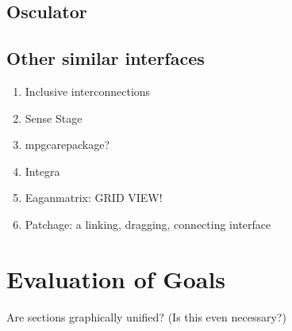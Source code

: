 	\subsection{Osculator} %
	\label{sub:osculator}
		\cite{osculator}

	\subsection{Other similar interfaces} %
	\label{sub:other_similar_interfaces}
	
	\begin{enumerate}
		\item Inclusive interconnections 
		\item Sense Stage 
		\item mpgcarepackage?
		\item Integra 
		\item Eaganmatrix: GRID VIEW! 
		\item Patchage: a linking, dragging, connecting interface 
	\end{enumerate}



\section{Evaluation of Goals} %
\label{sec:evaluation_of_goals}
	Are sections graphically unified? (Is this even necessary?)





